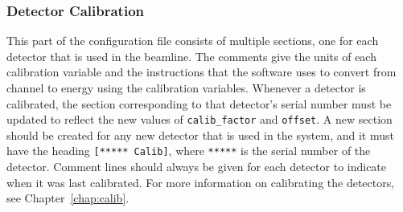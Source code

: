 \subsubsection{Detector Calibration}

This part of the configuration file consists of multiple sections, one for each
detector that is used in the beamline. The comments give the units of each
calibration variable and the instructions that the software uses to convert from
channel to energy using the calibration variables. Whenever a detector is
calibrated, the section corresponding to that detector's serial number must be
updated to reflect the new values of \verb|calib_factor| and \texttt{offset}. A
new section should be created for any new detector that is used in the system,
and it must have the heading \verb|[***** Calib]|, where \verb|*****| is the
serial number of the detector. Comment lines should always be given for each
detector to indicate when it was last calibrated. For more information on
calibrating the detectors, see Chapter~\ref{chap:calib}.
